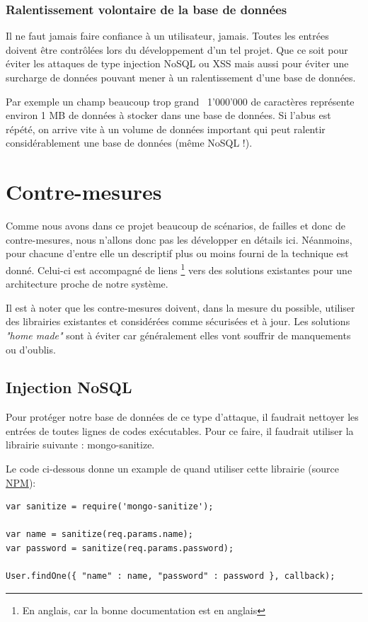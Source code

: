 \documentclass[12pt]{article}
\begin{document}
\subsubsection{Ralentissement volontaire de la base de données}

Il ne faut jamais faire confiance à un utilisateur, jamais. Toutes les entrées doivent être contrôlées lors du développement d'un tel projet. Que ce soit pour éviter les attaques de type injection NoSQL ou XSS mais aussi pour éviter une surcharge de données pouvant mener à un ralentissement d'une base de données. 

Par exemple un champ beaucoup trop grand ~1'000'000 de caractères représente environ 1 MB de données à stocker dans une base de données. Si l'abus est répété, on arrive vite à un volume de données important qui peut ralentir considérablement une base de données (même NoSQL !). 
\clearpage

\section{Contre-mesures}
\label{sec:contremesures}

Comme nous avons dans ce projet beaucoup de scénarios, de failles et donc de contre-mesures, nous n'allons donc pas les développer en détails ici. Néanmoins, pour chacune d'entre elle un descriptif plus ou moins fourni de la technique est donné. Celui-ci est accompagné de liens \footnote{En anglais, car la bonne documentation est en anglais} vers des solutions existantes pour une architecture proche de notre système.

Il est à noter que les contre-mesures doivent, dans la mesure du possible, utiliser des librairies existantes et considérées comme sécurisées et à jour. Les solutions \emph{"home made"} sont à éviter car généralement elles vont souffrir de manquements ou d'oublis.

\subsection{Injection NoSQL}
\label{ssec:cm-injections}

Pour protéger notre base de données de ce type d'attaque, il faudrait nettoyer les entrées de toutes lignes de codes exécutables. Pour ce faire, il faudrait utiliser la librairie suivante : mongo-sanitize. 

Le code ci-dessous donne un example de quand utiliser cette librairie (source \href{https://www.npmjs.com/package/mongo-sanitize}{NPM}):
\vspace{2mm}
\begin{lstlisting}[style=Java]
var sanitize = require('mongo-sanitize'); 

var name = sanitize(req.params.name); 
var password = sanitize(req.params.password);  

User.findOne({ "name" : name, "password" : password }, callback);  
\end{lstlisting}
\end{document}
